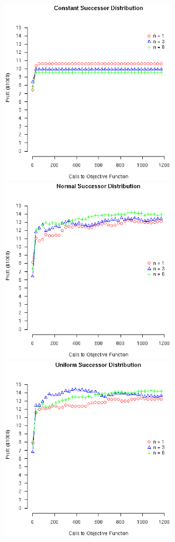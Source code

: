 \documentclass[12pt]{article}
\begin{document}
\begin{figure}[!ht]
  \begin{minipage}[b]{0.5\linewidth}
    \includegraphics[width=7.5cm]{RanCONSTANTDist.eps}
  \end{minipage}
  \begin{minipage}[b]{0.5\linewidth}
    \includegraphics[width=7.5cm]{RanNORMALDist.eps}
  \end{minipage}
  \begin{minipage}[b]{0.5\linewidth}
    \includegraphics[width=7.5cm]{RanUNIFORMDist.eps}
  \end{minipage}
\end{figure}
\end{document}
